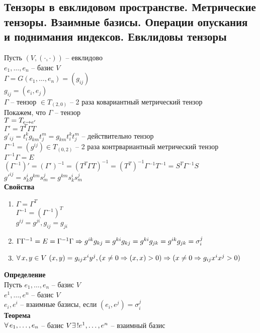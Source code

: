 \documentclass[12pt]{article}
\begin{document}
\subsection{Тензоры в евклидовом пространстве. Метрические тензоры. Взаимные базисы. Операции опускания и поднимания индексов. Евклидовы тензоры}
Пусть $(V, (\cdot, \cdot))$ -- евклидово\\
$e_1, \ldots, e_n$ -- базис $V$\\
$\Gamma = G(e_1, \ldots, e_n) = (g_{ij})$\\
$g_{ij} = (e_i, e_j)$\\
$\Gamma$ -- тензор $\in T_{(2,0)}$ -- 2 раза ковариантный метрический тензор\\
Покажем, что $\Gamma$ -- тензор\\
$T = T_{e\rightarrow e'}$\\
$\Gamma' = T^T \Gamma T$\\
$g'_{ij} = t^k_i g_{km} t^m_j = g_{km} t^k_i t^m_j$ -- действительно тензор\\
$\Gamma^{-1} = (g^{ij}) \in T_{(0,2)}$ -- 2 раза контрвариантный метрический тензор\\
$\Gamma^{-1} \Gamma = E$\\
$(\Gamma^{-1})' = (\Gamma')^{-1} = (T^T \Gamma T)^{-1} = (T^T)^{-1} \Gamma^{-1} T^{-1} = S^T \Gamma^{-1} S$\\
$g'^{ij} = s^i_k g^{km} s^j_m = g^{km}s^i_ks^j_m$\\
\textbf{Свойства}
\begin{enumerate}
    \item $\Gamma = \Gamma^T$\\
    $\Gamma^{-1} = (\Gamma^{-1})^T$\\
    $g^{ij} = g^{ji}, g_{ij} = g_{ji}$
    \item $\Gamma\Gamma^{-1} = E = \Gamma^{-1}\Gamma \Rightarrow g^{ik}g_{kj} = g^{ki}g_{kj} = g^{ki}g_{jk} = g^{ik}g_{jk} = \sigma_i^j$
    \item $\forall\, x, y \in V\ (x,y) = g_{ij} x^i y^j, (x\neq 0 \Rightarrow (x,x)> 0) \Rightarrow (x \neq 0 \Rightarrow g_{ij}x^ix^j > 0)$
\end{enumerate}
\textbf{Определение}\\
Пусть $e_1, \ldots, e_n $ -- базис $V$\\
$e^1, \ldots, e^n$ -- базис $V$\\
$e_i, e^i$ -- взаимные базисы, если $(e_i, e^j) = \sigma_i^j$\\
\textbf{Теорема}\\
$\forall\, e_1, \ldots, e_n$ -- базис $V \exists\,! e^1, \ldots, e^n$ -- взаимный базис\\
\end{document}
